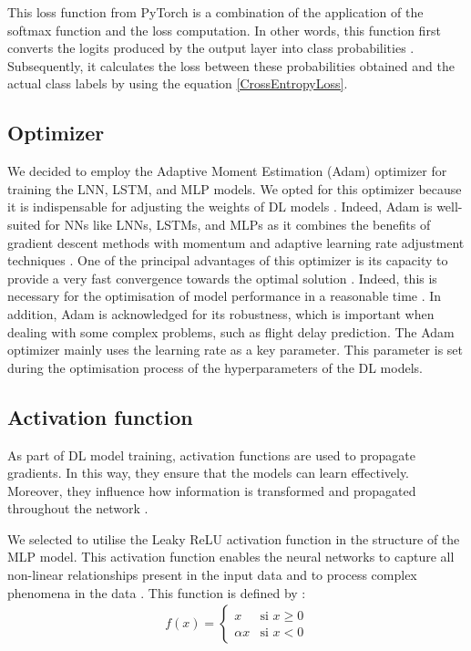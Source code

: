 \documentclass[12pt,oneside]{book} %
\begin{document}
\noindent This loss function from PyTorch is a combination of the application of the softmax function and  the loss computation. In other words, this  function first converts the logits produced by the output layer into class probabilities \cite{crossentropyloss}. Subsequently, it calculates the loss between these probabilities obtained and the actual class labels by using the equation \ref{CrossEntropyLoss}.

\subsection{Optimizer}

\noindent We decided to employ the Adaptive Moment Estimation (Adam) optimizer for training the LNN, LSTM, and MLP models. We opted for this optimizer because it is indispensable for adjusting the weights of DL models \cite{Adam_optimizer1}. Indeed, Adam is well-suited for NNs like LNNs, LSTMs, and MLPs as it combines the benefits of gradient descent methods with momentum and adaptive learning rate adjustment techniques \cite{Adam_optimizer}. One of the principal advantages of this optimizer is its capacity to provide a very fast convergence towards the optimal solution \cite{Adam_optimizer1}. Indeed, this is necessary for the optimisation of model performance in a reasonable time \cite{Adam_optimizer1}. In addition, Adam is acknowledged for its robustness, which is important when dealing with some complex problems, such as flight delay prediction. The Adam optimizer mainly uses the learning rate as a key parameter. This parameter is set during the optimisation process of the hyperparameters of the DL models.

\subsection{Activation function}

\noindent As part of DL model training, activation functions are used to propagate gradients. In this way, they ensure that the models can learn effectively. Moreover, they influence how information is transformed and propagated throughout the network \cite{leaky_relu1}.

\noindent We selected to utilise the Leaky ReLU activation function in the structure of the MLP model. This activation function enables the neural networks to capture all non-linear relationships present in the input data and to process complex phenomena in the data \cite{leaky_relu1}. This function is defined by \cite{leaky_relu_equation}:
\begin{align}
f(x) = 
\begin{cases} 
x & \text{si } x \geq 0 \\
\alpha x & \text{si } x < 0 
\end{cases}
\label{Leaky_ReLU}
\end{align}
\end{document}
